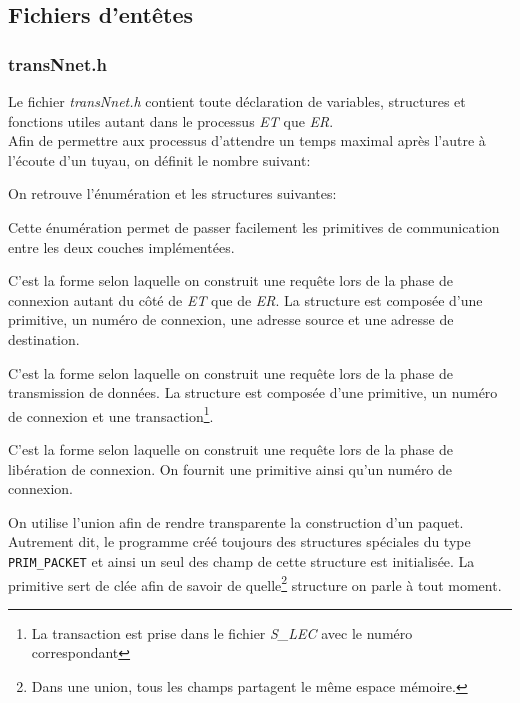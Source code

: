 \documentclass[11pt,french]{article}
\begin{document}
	\subsection{Fichiers d'entêtes}
	\label{sub:fich-entetes-transport-entity}
		\subsubsection{transNnet.h}
		\label{ssub:transNnet.h}
			Le fichier \emph{transNnet.h} contient toute déclaration de variables, structures et fonctions utiles
			autant dans le processus \emph{ET} que \emph{ER}.\\

			Afin de permettre aux processus d'attendre un temps maximal après l'autre à l'écoute d'un tuyau,
			on définit le nombre suivant:
			

			On retrouve l'énumération et les structures suivantes:
			
            
			Cette énumération permet de passer facilement les primitives de communication entre les deux couches implémentées.
			
            
            C'est la forme selon laquelle on construit une requête lors de la phase de connexion autant du côté de \emph{ET} que de \emph{ER}. 
            La structure est composée d'une primitive, un numéro de connexion, une adresse source et une adresse de destination.

            
            C'est la forme selon laquelle on construit une requête lors de la phase de transmission de données. La structure est composée d'une primitive,
            un numéro de connexion et une transaction\footnote{La transaction est prise dans le fichier \emph{S\_LEC} avec le numéro correspondant}.

            
            C'est la forme selon laquelle on construit une requête lors de la phase de libération de connexion. On fournit une primitive ainsi qu'un 
            numéro de connexion.

            
            On utilise l'union afin de rendre transparente la construction d'un paquet. Autrement dit, le programme créé toujours des structures spéciales 
            du type \texttt{PRIM\_PACKET} et ainsi un seul des champ de cette structure est initialisée. La primitive sert de clée afin de savoir de
            quelle\footnote{Dans une union, tous les champs partagent le même espace mémoire.} structure on parle à tout moment.
\end{document}
